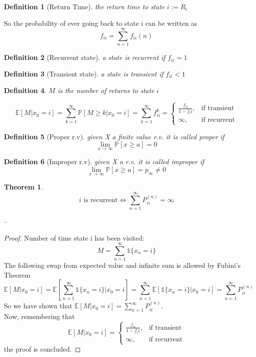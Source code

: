 \documentclass[a4paper,12pt]{report}
\newtheorem{theorem}{Theorem}[section]
\newtheorem{definition}{Definition}
\begin{document}
\begin{definition}[Return Time] 
the return time to state $i := R_i$
\end{definition}

So the probability of ever going back to state i can be written as
$$f_{ii} = \sum_{n=1}^\infty f_{ii}(n) $$

\begin{definition}[Recurrent state]
a state is recurrent if $f_{ii} = 1$
\end{definition}

\begin{definition}[Transient state]
a state is transient if  $f_{ii} < 1$
\end{definition}  

\begin{definition}
$M$ is the number of returns to state $i$
\end{definition}

$$\mathbb{E}[M | x_0 = i] = \sum_{k=1}^\infty \mathbb{P}[M\geq k | x_0 = i] = \sum_{k=1}^\infty f_{ii}^k = \begin{cases} 
\frac{f_{ii}}{1-f_ii}, & \mbox{if transient} \\ 
\infty, & \mbox{if recurrent}
\end{cases}$$

\begin{definition}[Proper r.v]
given X a finite value r.v. it is called proper if $$\lim_{x\to \infty} \mathbb{P}[x\geq a] = 0$$
\end{definition}

\begin{definition}[Improper r.v]
given X a r.v. it is called improper if  $$\lim_{x\to \infty} \mathbb{P}[x\geq a] = p_\infty \ne 0$$
\end{definition}


\begin{theorem}
$$i  \mbox{ is recurrent} \iff \sum_{n=1}^\infty P_{ii}^{(n)} = \infty$$
\end{theorem}
--
\begin{proof}
Number of time state i has been visited: $$M = \sum_{n=1}^\infty \mathds{1}\{x_n =i\} $$
The following swap from expected value and infinite sum is allowed by Fubini's Theorem$$ \mathbb{E}[M | x_0 = i] = \mathbb{E}[\sum_{n=1}^\infty \mathds{1}\{x_n = i\} | x_0 = i] = \sum_{n=1}^\infty \mathbb{E}[\mathds{1}\{ x_n = i\} | x_0 = i] = \sum_{n=1}^\infty P_{ii}^{(n)} $$
So we have shown that $\mathbb{E}[M | x_0=i] = \sum_{n=1}^\infty P_{ii}^{(n)}$.\\
Now, remembering that$$ \mathbb{E}[M | x_0 = i] = \begin{cases} 
\frac{f_{ii}}{1-f_ii}, & \mbox{if transient} \\ 
\infty, & \mbox{if recurrent}
\end{cases}$$
the proof is concluded.
\end{proof}
\end{document}
